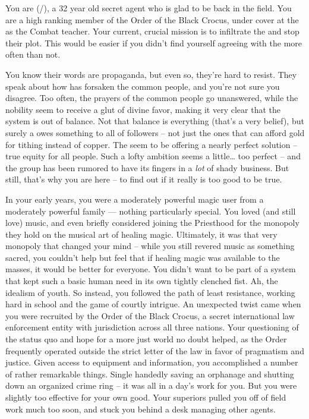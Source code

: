 \documentclass[char]{GL2020}
\begin{document}
\name{\cInterpol{}}

You are \cInterpol{\full} (\cInterpol{\they}/\cInterpol{\them}), a 32 year old secret agent who is glad to be back in the field. You are a high ranking member of the Order of the Black Crocus, under cover at the \pSchool{} as the Combat teacher. Your current, crucial mission is to infiltrate the \pGoaties{} and stop their plot. This would be easier if you didn't find yourself agreeing with the \pGoaties{} more often than not.

You know their words are propaganda, but even so, they're hard to resist. They speak about how \cFarmGod{} has forsaken the common people, and you're not sure you disagree. Too often, the prayers of the common people go unanswered, while the nobility seem to receive a glut of divine favor, making it very clear that the system is out of balance. Not that balance is everything (that's a very \pShip{} belief), but surely a \cFarmGod{\God} owes something to all of \cFarmGod{\their} followers -- not just the ones that can afford gold for tithing instead of copper. The \pGoaties{} seem to be offering a nearly perfect solution -- true equity for all people. Such a lofty ambition seems a little\dots{} too perfect -- and the group has been rumored to have its fingers in a \emph{lot} of shady business. But still, that's why you are here -- to find out if it really is too good to be true. 

In your early years, you were a moderately powerful magic user from a moderately powerful family — nothing particularly special. You loved (and still love) music, and even briefly considered joining the Priesthood for the monopoly they hold on the musical art of healing magic. Ultimately, it was that very monopoly that changed your mind – while you still revered music as something sacred, you couldn't help but feel that if healing magic was available to the masses, it would be better for everyone. You didn't want to be part of a system that kept such a basic human need in its own tightly clenched fist. Ah, the idealism of youth. So instead, you followed the path of least resistance, working hard in school and the game of courtly intrigue. An unexpected twist came when you were recruited by the Order of the Black Crocus, a secret international law enforcement entity with jurisdiction across all three nations. Your questioning of the status quo and hope for a more just world no doubt helped, as the Order frequently operated outside the strict letter of the law in favor of pragmatism and justice. Given access to equipment and information, you accomplished a number of rather remarkable things. Single handedly saving an orphanage and shutting down an organized crime ring -- it was all in a day's work for you. But you were slightly too effective for your own good. Your superiors pulled you off of field work much too soon, and stuck you behind a desk managing other agents.
\end{document}
